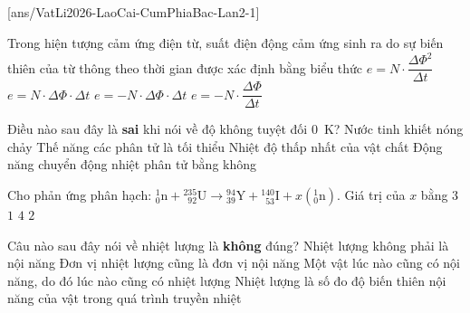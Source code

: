 
	\noindent
	\subsection*{}
	\setcounter{ex}{0}
	[ans/VatLi2026-LaoCai-CumPhiaBac-Lan2-1]

	\begin{ex}%
		Trong hiện tượng cảm ứng điện từ, suất điện động cảm ứng sinh ra do sự biến thiên của từ thông theo thời gian được xác định bằng biểu thức
		\choice
		{$e=N\cdot\dfrac{\Delta\Phi^2}{\Delta t}$}
		{$e=N\cdot\Delta\Phi\cdot\Delta t$}
		{$e=-N\cdot\Delta\Phi\cdot\Delta t$}
		{\True $e=-N\cdot\dfrac{\Delta\Phi}{\Delta t}$}
	\end{ex}

	\begin{ex}%
		Điều nào sau đây là \textbf{sai} khi nói về độ không tuyệt đối $0$~K?
		\choice
		{\True Nước tinh khiết nóng chảy}
		{Thế năng các phân tử là tối thiểu}
		{Nhiệt độ thấp nhất của vật chất}
		{Động năng chuyển động nhiệt phân tử bằng không}
	\end{ex}

	\begin{ex}%
		Cho phản ứng phân hạch: ${}^{1}_{0}\text{n}+{}^{235}_{\phantom{2}92}\text{U}\to{}^{94}_{39}\text{Y}+{}^{140}_{\phantom{1}53}\text{I}+x\left({}^{1}_{0}\text{n}\right)$. Giá trị của $x$ bằng
		\choice
		{$3$}
		{$1$}
		{$4$}
		{\True $2$}
	\end{ex}

	\begin{ex}%
		Câu nào sau đây nói về nhiệt lượng là \textbf{không} đúng?
		\choice
		{Nhiệt lượng không phải là nội năng}
		{Đơn vị nhiệt lượng cũng là đơn vị nội năng}
		{\True Một vật lúc nào cũng có nội năng, do đó lúc nào cũng có nhiệt lượng}
		{Nhiệt lượng là số đo độ biến thiên nội năng của vật trong quá trình truyền nhiệt}
	\end{ex}

